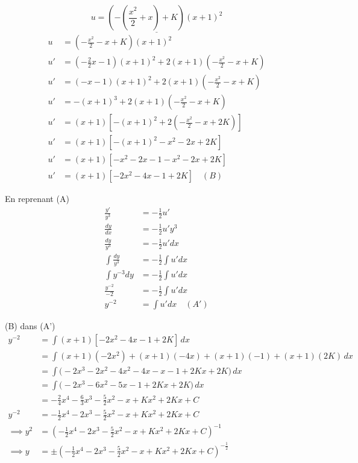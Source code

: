 \[
\underline{u = \left(- \left(\frac{x^2}{2} + x\right) + K\right) (x+1)^2}
\]
\begin{align*}
	u &= (-\frac{x^2}{2} - x + K) (x+1)^2 \\
	u' &= (-\frac{2}{2}x - 1) (x+1)^2 + 2 (x+1) (-\frac{x^2}{2} - x + K) \\
	u' &= (-x - 1) (x+1)^2 + 2 (x+1) (-\frac{x^2}{2} - x + K) \\
	u' &= -(x+1)^3 + 2 (x+1) (-\frac{x^2}{2} - x + K) \\
	u' &= (x+1) [-(x+1)^2 + 2(-\frac{x^2}{2} - x + 2K)] \\
	u' &= (x+1) [-(x+1)^2 -x^2 -2x + 2K] \\
	u' &= (x+1) [-x^2 - 2x -1 -x^2 -2x + 2K] \\
	u' &= (x+1) [-2x^2 - 4x -1 + 2K] \quad (B)
\end{align*}

En reprenant (A)
\begin{align*}
	\frac{y'}{y^3} &= -\frac{1}{2}u'\\
	\frac{dy}{dx} &= -\frac{1}{2}u' y^3 \\
	\frac{dy}{y^3} &= - \frac{1}{2} u' dx \\
	\int \frac{dy}{y^3} &= - \frac{1}{2} \int u' dx \\
	\int y^{-3}{dy} &= - \frac{1}{2} \int u' dx \\
	\frac{y^{-2}}{-2} &= - \frac{1}{2} \int u' dx \\
	{y^{-2}} &=\int u' dx \quad (A')
\end{align*}

(B) dans (A')
\begin{align*}
	y^{-2} &= \int (x+1) [-2x^2 - 4x -1 + 2K] \, dx \\
	&= \int (x+1)(-2x^2) + (x+1)(-4x) + (x+1)(-1) + (x+1)(2K) \, dx \\
	&= \int \big( -2x^3 - 2x^2 - 4x^2 - 4x - x - 1 + 2Kx + 2K \big) \, dx \\
	&= \int \big( -2x^3 - 6x^2 - 5x - 1 + 2Kx + 2K \big) \, dx \\
	&= -\frac{2}{4}x^4 - \frac{6}{3}x^3 - \frac{5}{2}x^2 - x + Kx^2 + 2Kx + C \\
	y^{-2} &= -\frac{1}{2}x^4 - 2x^3 - \frac{5}{2}x^2 - x + Kx^2 + 2Kx + C \\ 
	\implies
	y^2 &= (-\frac{1}{2}x^4 - 2x^3 - \frac{5}{2}x^2 - x + Kx^2 + 2Kx + C) ^{-1} \\
	\implies
	y &= \pm (-\frac{1}{2}x^4 - 2x^3 - \frac{5}{2}x^2 - x + Kx^2 + 2Kx + C) ^{-\frac{1}{2}}
\end{align*}

